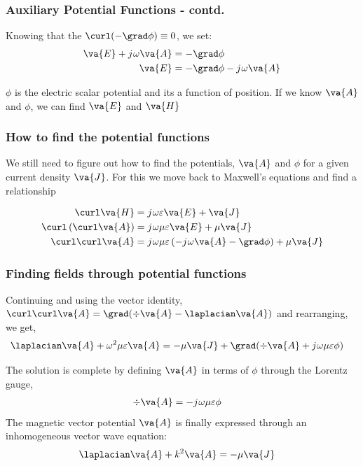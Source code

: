 \documentclass[10pt, compress]{beamer}
\renewcommand{\O}{\omega}  %
\newcommand{\E}{\varepsilon}  %
\renewcommand{\u}{\mu}  %
\renewcommand{\j}{{j}\mkern1mu} %
\begin{document}
\begin{frame}
  \frametitle{Auxiliary Potential Functions - contd.}
  Knowing that the $\curl (-\grad \phi) \equiv 0 $, we set:
  \begin{align*}
    \va{E} + \j \O \va{A} & = -\grad \phi                \\
    \va{E}                & = -\grad \phi - \j \O \va{A}
  \end{align*}
  \begin{outline}
    \1 $\phi$ is the electric scalar potential and its a function of position.
    \1 If we know $\va{A}$ and $\phi$, we can find $\va{E}$ and $\va{H}$
  \end{outline}
\end{frame}



\begin{frame}
  \frametitle{How to find the potential functions}

  \begin{outline}
    \1 We still need to figure out how to find the potentials,   $\va{A}$ and $\phi$ for a given current density $\va{J}$.
    \1 For this we move back to Maxwell's equations and find a relationship
  \end{outline}
  \begin{align*}
    \curl \va{H}                      & = \j \O \E \va{E} + \va{J}                                         \\
    \curl \left( \curl \va{A} \right) & = \j \O \u \E \va{E} + \u \va{J}                                   \\
    \curl \curl \va{A}                & = \j \O \u \E \left(-\j \O \va{A} - \grad \phi \right) + \u \va{J}
  \end{align*}
\end{frame}

\begin{frame}
  \frametitle{Finding fields through potential functions}
  Continuing and using the vector identity,
  $\curl \curl \va{A} = \grad ( \div  \va{A} - \laplacian \va{A})$
  and rearranging, we get,
  \begin{align*}
    \laplacian \va{A} + \O^2 \u \E \va{A} & = -\u \va{J} + \grad (\div \va{A} +  \j \O \u \E \phi)
  \end{align*}

  The solution is complete by defining $\va{A}$ in terms of $\phi$ through the Lorentz gauge,
  \begin{align*}
    \div \va{A} & = - \j \O \u \E \phi
  \end{align*}
  The magnetic vector potential $\va{A}$ is finally expressed through an inhomogeneous vector wave equation:
  \begin{align*}
    \laplacian \va{A} + k^2 \va{A} & = -\u \va{J}
  \end{align*}
\end{frame}
\end{document}
